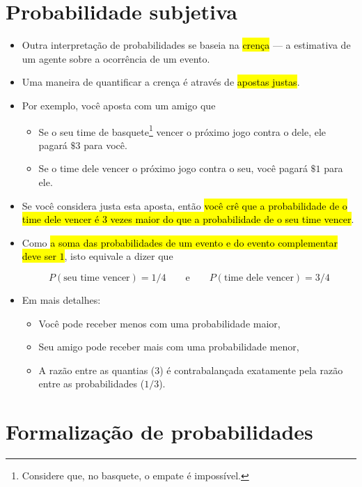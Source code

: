\documentclass[
  11pt]{report}
\begin{document}
\hypertarget{probabilidade-subjetiva}{%
\section{Probabilidade subjetiva}\label{probabilidade-subjetiva}}

\begin{itemize}
\item
  Outra interpretação de probabilidades se baseia na {\hl{crença}} --- a estimativa de um agente sobre a ocorrência de um evento.
\item
  Uma maneira de quantificar a crença é através de {\hl{apostas justas}}.
\item
  Por exemplo, você aposta com um amigo que

  \begin{itemize}
  \item
    Se o seu time de basquete\footnote{Considere que, no basquete, o empate é impossível.} vencer o próximo jogo contra o dele, ele pagará $\$3$ para você.
  \item
    Se o time dele vencer o próximo jogo contra o seu, você pagará $\$1$ para ele.
  \end{itemize}
\item
  Se você considera justa esta aposta, então {\hl{você crê que a probabilidade de o time dele vencer é $3$ vezes maior do que a probabilidade de o seu time vencer}}.
\item
  Como {\hl{a soma das probabilidades de um evento e do evento complementar deve ser $1$}}, isto equivale a dizer que

  \[
  P(\text{seu time vencer}) = 1/4 \qquad\text{e}\qquad  P(\text{time dele vencer}) = 3/4
  \]
\item
  Em mais detalhes:

  \begin{itemize}
  \item
    Você pode receber menos com uma probabilidade maior,
  \item
    Seu amigo pode receber mais com uma probabilidade menor,
  \item
    A razão entre as quantias ($3$) é contrabalançada exatamente pela razão entre as probabilidades ($1/3$).
  \end{itemize}
\end{itemize}

\hypertarget{axiomas}{%
\section{Formalização de probabilidades}\label{axiomas}}
\end{document}
